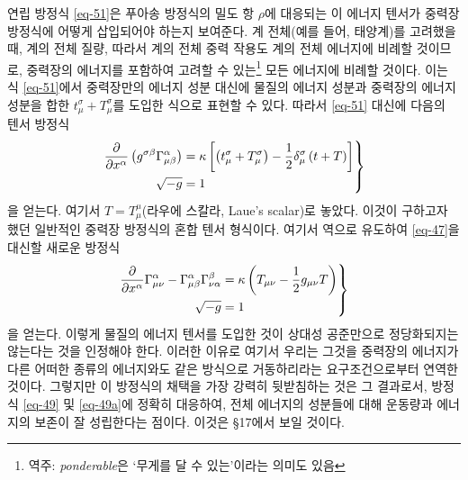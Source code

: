 연립 방정식 \eqref{eq-51}은 푸아송 방정식의 밀도 항 $\rho$에 대응되는 이 에너지 텐서가 중력장 방정식에 어떻게 삽입되어야 하는지 보여준다.
계 전체(예를 들어, 태양계)를 고려했을 때, 계의 전체 질량, 따라서 계의 전체 중력 작용도 계의 전체 에너지에 비례할 것이므로, 중력장의 에너지를 포함하여 고려할 수 있는\footnote{역주: \emph{ponderable}은 `무게를 달 수 있는'이라는 의미도 있음} 모든 에너지에 비례할 것이다. 이는 식 \eqref{eq-51}에서 중력장만의 에너지 성분 대신에 물질의 에너지 성분과 중력장의 에너지 성분을 합한 $t_\mu^\sigma+T_\mu^\sigma$를 도입한 식으로 표현할 수 있다. 따라서 \eqref{eq-51} 대신에 다음의 텐서 방정식
\begin{equation} \label{eq-52}
	\left.
	\begin{aligned}
		{\frac{{\partial}{}}{{\partial}{x^\alpha}}} \left( g^{\sigma\beta} \Gamma_{\mu\beta}^{\alpha} \right)
		&= \kappa\left[\left( t_\mu^\sigma+T_\mu^\sigma \right) - \frac{1}{2} \delta_\mu^\sigma \left(t+T\right)\right]\\
		\sqrt{-g} &= 1
	\end{aligned}
	\right\}
\end{equation}
을 얻는다. 여기서 $T=T_\mu^\mu$(라우에 스칼라, Laue's scalar)로 놓았다. 이것이 구하고자 했던 일반적인 중력장 방정식의 혼합 텐서 형식이다. 여기서 역으로 유도하여 \eqref{eq-47}을 대신할 새로운 방정식
\begin{equation} \label{eq-53}
	\left.
	\begin{aligned}
		{\frac{{\partial}{}}{{\partial}{x^\alpha}}}\Gamma_{\mu\nu}^{\alpha}
		- \Gamma_{\mu\beta}^{\alpha}\Gamma_{\nu\alpha}^{\beta}
		&= \kappa\left( T_{\mu\nu} - \frac{1}{2} g_{\mu\nu}T \right)\\
		\sqrt{-g}&=1
	\end{aligned} \right\}
\end{equation}
을 얻는다. 이렇게 물질의 에너지 텐서를 도입한 것이 상대성 공준만으로 정당화되지는 않는다는 것을 인정해야 한다. 이러한 이유로 여기서 우리는 그것을 중력장의 에너지가 다른 어떠한 종류의 에너지와도 같은 방식으로 거동하리라는 요구조건으로부터 연역한 것이다. 그렇지만 이 방정식의 채택을 가장 강력히 뒷받침하는 것은 그 결과로서, 방정식 \eqref{eq-49} 및 \eqref{eq-49a}에 정확히 대응하여, 전체 에너지의 성분들에 대해 운동량과 에너지의 보존이 잘 성립한다는 점이다. 이것은 \S 17에서 보일 것이다.
